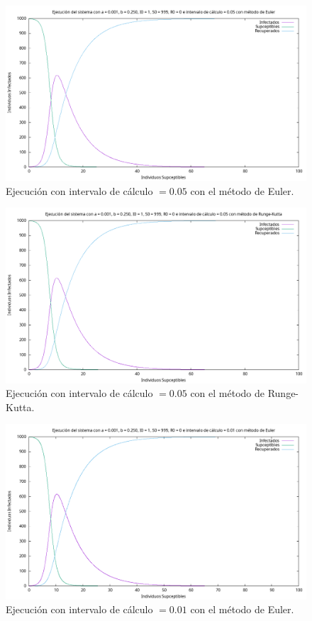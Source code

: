 \documentclass[12pt, spanish]{article}
\begin{document}
\begin{figure}[H]
	\centering
			\includegraphics[width=\textwidth]{SIR_005_euler.png}
			\caption{Ejecución con intervalo de cálculo $= 0.05$ con el método de Euler.}
\end{figure}

\begin{figure}[H]
	\centering
			\includegraphics[width=\textwidth]{SIR_005_runge.png}
			\caption{Ejecución con intervalo de cálculo $= 0.05$ con el método de Runge-Kutta.}
\end{figure}



\begin{figure}[H]
	\centering
			\includegraphics[width=\textwidth]{SIR_001_euler.png}
			\caption{Ejecución con intervalo de cálculo $= 0.01$ con el método de Euler.}
\end{figure}
\end{document}
